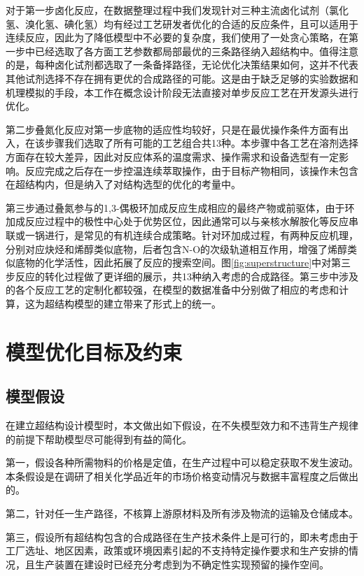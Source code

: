 对于第一步卤化反应，在数据整理过程中我们发现针对三种主流卤化试剂（氯化氢、溴化氢、碘化氢）均有经过工艺研发者优化的合适的反应条件，且可以适用于连续反应，因此为了降低模型中不必要的复杂度，我们使用了一处贪心策略，在第一步中已经选取了各方面工艺参数都局部最优的三条路径纳入超结构中。值得注意的是，每种卤化试剂都选取了一条备择路径，无论优化决策结果如何，这并不代表其他试剂选择不存在拥有更优的合成路径的可能。这是由于缺乏足够的实验数据和机理模拟的手段，本工作在概念设计阶段无法直接对单步反应工艺在开发源头进行优化。

第二步叠氮化反应对第一步底物的适应性均较好，只是在最优操作条件方面有出入，在该步骤我们选取了所有可能的工艺组合共13种。本步骤中各工艺在溶剂选择方面存在较大差异，因此对反应体系的温度需求、操作需求和设备选型有一定影响。反应完成之后存在一步控温连续萃取操作，由于目标产物相同，该操作未包含在超结构内，但是纳入了对结构选型的优化的考量中。

第三步通过叠氮参与的1,3-偶极环加成反应生成相应的最终产物或前驱体，由于环加成反应过程中的极性中心处于优势区位，因此通常可以与亲核水解胺化等反应串联或一锅进行，是常见的有机连续合成策略。针对环加成过程，有两种反应机理，分别对应炔烃和烯醇类似底物，后者包含N-O的次级轨道相互作用，增强了烯醇类似底物的化学活性，因此拓展了反应的搜索空间\cite{paz2018}。图\ref{fig:superstructure}中对第三步反应的转化过程做了更详细的展示，共13种纳入考虑的合成路径。第三步中涉及的各个反应工艺的定制化都较强，在模型的数据准备中分别做了相应的考虑和计算，这为超结构模型的建立带来了形式上的统一。

\section{模型优化目标及约束}
\subsection{模型假设}

在建立超结构设计模型时，本文做出如下假设，在不失模型效力和不违背生产规律的前提下帮助模型尽可能得到有益的简化。

第一，假设各种所需物料的价格是定值，在生产过程中可以稳定获取不发生波动。本条假设是在调研了相关化学品近年的市场价格变动情况与数据丰富程度之后做出的。

第二，针对任一生产路径，不核算上游原材料及所有涉及物流的运输及仓储成本。

第三，假设所有超结构包含的合成路径在生产技术条件上是可行的，即未考虑由于工厂选址、地区因素，政策或环境因素引起的不支持特定操作要求和生产安排的情况，且生产装置在建设时已经充分考虑到为不确定性实现预留的操作空间。

